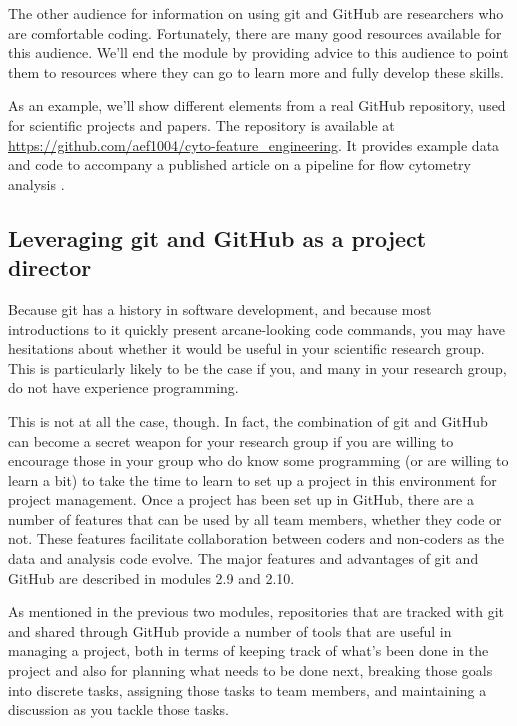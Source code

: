 \documentclass[]{tufte-book}
\begin{document}
The other audience for information on using git and GitHub are researchers who
are comfortable coding. Fortunately, there are many good resources available for
this audience. We'll end the module by providing advice to this audience to
point them to resources where they can go to learn more and fully develop these
skills.

As an example, we'll show different elements from a real GitHub repository, used
for scientific projects and papers. The repository is available at
\url{https://github.com/aef1004/cyto-feature_engineering}. It provides example data
and code to accompany a published article on a pipeline for flow cytometry
analysis \citep{fox2020cyto}.

\subsection{Leveraging git and GitHub as a project director}\label{leveraging-git-and-github-as-a-project-director}

Because git has a history in software development, and because most
introductions to it quickly present arcane-looking code commands, you may have
hesitations about whether it would be useful in your scientific research group.
This is particularly likely to be the case if you, and many in your research
group, do not have experience programming.

This is not at all the case, though. In fact, the combination of git and GitHub
can become a secret weapon for your research group if you are willing to
encourage those in your group who do know some programming (or are willing to
learn a bit) to take the time to learn to set up a project in this environment
for project management. Once a project has been set up in GitHub, there are a
number of features that can be used by all team members, whether they code or
not. These features facilitate collaboration between coders and non-coders as
the data and analysis code evolve. The major features and advantages of git and
GitHub are described in modules 2.9 and 2.10.

As mentioned in the previous two modules, repositories that are tracked with
git and shared through GitHub provide a number of tools that are useful in
managing a project, both in terms of keeping track of what's been done in the
project and also for planning what needs to be done next, breaking those goals
into discrete tasks, assigning those tasks to team members, and maintaining a
discussion as you tackle those tasks.
\end{document}

